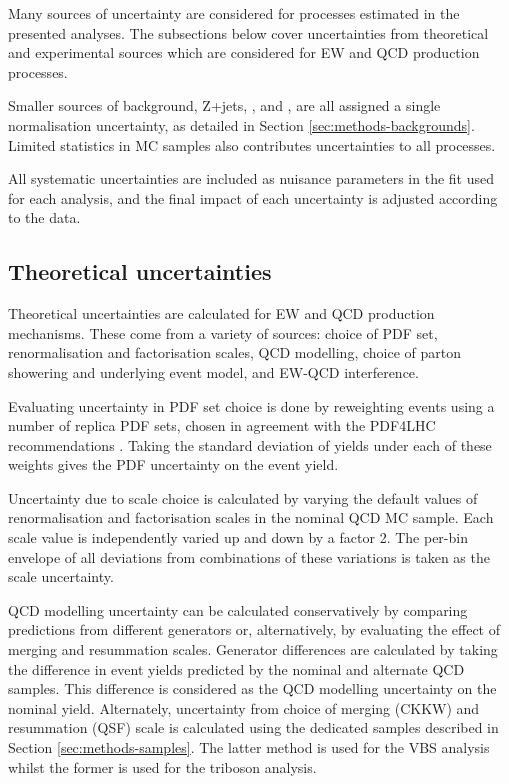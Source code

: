 
Many sources of uncertainty are considered for processes estimated in the
presented analyses. The subsections below cover uncertainties from theoretical
and experimental sources which are considered for \ac{EW} and \ac{QCD} \Zyjj
production processes.

Smaller sources of background, Z+jets, \tty, and \WZjj, are all assigned a
single normalisation uncertainty, as detailed in Section
\ref{sec:methods-backgrounds}.
Limited statistics in \ac{MC} samples also contributes uncertainties to all
processes.

All systematic uncertainties are included as nuisance parameters in the fit used
for each analysis, and the final impact of each uncertainty is adjusted
according to the data.

\subsection{Theoretical uncertainties}

Theoretical uncertainties are calculated for \ac{EW} and \ac{QCD} \Zy production
mechanisms. These come from a variety of sources: choice of \ac{PDF} set,
renormalisation and factorisation scales, \ac{QCD} modelling, choice of parton
showering and underlying event model, and \ac{EW}-\ac{QCD} interference.

Evaluating uncertainty in \ac{PDF} set choice is done by reweighting events
using a number of replica \ac{PDF} sets, chosen in agreement with the PDF4LHC
recommendations \cite{Butterworth2016}. Taking the standard deviation of yields
under each of these weights gives the \ac{PDF} uncertainty on the event yield. 

Uncertainty due to scale choice is calculated by varying the default values of
renormalisation and factorisation scales in the nominal QCD \Zy \ac{MC} sample.
Each scale value is independently varied up and down by a factor 2.
The per-bin envelope of all deviations from combinations of these variations
is taken as the scale uncertainty.

\ac{QCD} modelling uncertainty can be calculated conservatively by comparing
predictions from different generators or, alternatively, by evaluating the
effect of merging and resummation scales. Generator differences are calculated
by taking the difference in event yields predicted by the nominal and alternate
\ac{QCD} \Zy samples. This difference is considered as the \ac{QCD} modelling
uncertainty on the nominal yield.
Alternately, uncertainty from choice of merging (CKKW) and
resummation (QSF) scale is calculated using the dedicated samples described in
Section \ref{sec:methods-samples}. The latter method is used for the \ac{VBS}
analysis whilst the former is used for the triboson analysis.

